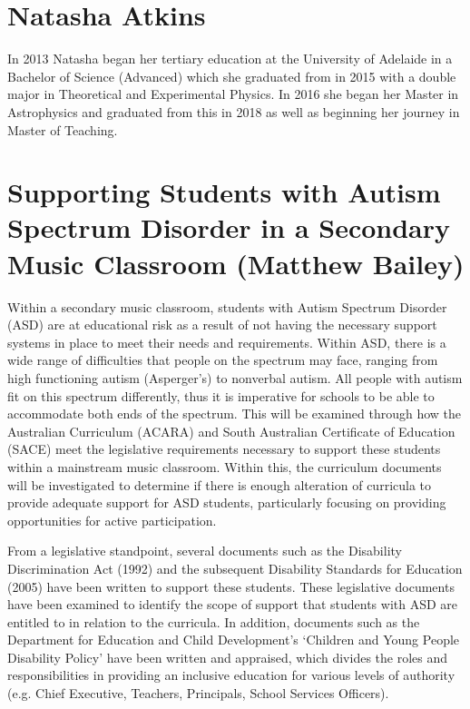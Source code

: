 \documentclass[twoside,12pt,a4paper,notitlepage]{memoir}
\begin{document}
\section*{Natasha Atkins}

In 2013 Natasha began her tertiary education at the University of Adelaide in a Bachelor of Science (Advanced) which she graduated from in 2015 with a double major in Theoretical and Experimental Physics. In 2016 she began her Master in Astrophysics and graduated from this in 2018 as well as beginning her journey in Master of Teaching.



\pagebreak
\section*{Supporting Students with Autism Spectrum Disorder in a Secondary Music Classroom (Matthew Bailey)}
\label{aut:bailey}

Within a secondary music classroom, students with Autism Spectrum Disorder (ASD) are at educational risk as a result of not having the necessary support systems in place to meet their needs and requirements. Within ASD, there is a wide range of difficulties that people on the spectrum may face, ranging from high functioning autism (Asperger’s) to nonverbal autism. All people with autism fit on this spectrum differently, thus it is imperative for schools to be able to accommodate both ends of the spectrum. This will be examined through how the Australian Curriculum (ACARA) and South Australian Certificate of Education (SACE) meet the legislative requirements necessary to support these students within a mainstream music classroom. Within this, the curriculum documents will be investigated to determine if there is enough alteration of curricula to provide adequate support for ASD students, particularly focusing on providing opportunities for active participation.


From a legislative standpoint, several documents such as the Disability Discrimination Act (1992) and the subsequent Disability Standards for Education (2005) have been written to support these students. These legislative documents have been examined to identify the scope of support that students with ASD are entitled to in relation to the curricula. In addition, documents such as the Department for Education and Child Development’s ‘Children and Young People Disability Policy’ have been written and appraised, which divides the roles and responsibilities in providing an inclusive education for various levels of authority (e.g. Chief Executive, Teachers, Principals, School Services Officers).
\end{document}
